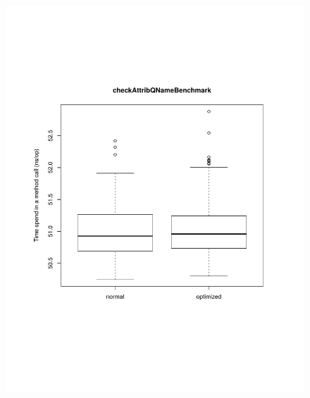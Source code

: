 \begin{figure}[H]
	\centering

	\centerline{
		\includegraphics[trim=0mm 60mm 20mm 50mm,scale=0.50]{pictures/boxplot_checkAttribQName.pdf}
}
\end{figure}
